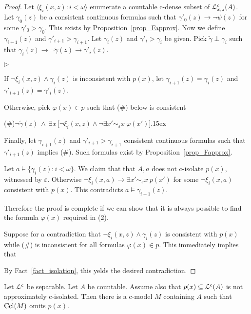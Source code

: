 \documentclass{amsproc}
\newcommand{\mylabel}[1]{{#1}\hfill}
\renewenvironment{itemize}
  {\begin{list}{$\triangleright$}{%
  \setlength{\parskip}{0mm}
  \setlength{\topsep}{.4\baselineskip}
  \setlength{\rightmargin}{0mm}
  \setlength{\listparindent}{0mm}
  \setlength{\itemindent}{0mm}
  \setlength{\labelwidth}{3ex}
  \setlength{\itemsep}{.2\baselineskip}
  \setlength{\parsep}{.2\baselineskip}
  \setlength{\partopsep}{0mm}
  \setlength{\labelsep}{1ex}
  \setlength{\leftmargin}{\labelwidth+\labelsep}
  \let\makelabel\mylabel}}{%
\end{list}}
\begin{document}
{\begin{proof}
  Let $\langle\xi_i(x,z):i<\omega\rangle$ enumerate a countable c-dense subset of ${\EuScript L}^{\rm c}_{x,z}(A)$.
  Let $\gamma_0(z)$ be a consistent continuous formulas such that $\gamma'_0(z)\rightarrow\neg\psi(z)$ for some $\gamma'_0>\gamma_0$.
  This exists by Proposition~\ref{prop_Fapprox}.
  Now we define $\gamma_{i+1}(z)$ and $\gamma'_{i+1}>\gamma_{i+1}$.
  Let $\gamma_i(z)$ and $\gamma'_i>\gamma_i$ be given.
  Pick $\tilde{\gamma}\perp\gamma_i$ such that $\gamma_i(z)\rightarrow\neg\tilde{\gamma}(z)\rightarrow\gamma'_i(z)$.
  
  \begin{itemize}
  \item[1.] If $\neg\xi_i(x,z)\wedge\gamma_i(z)$ is inconsistent with $p(x)$, let $\gamma_{i+1}(z)=\gamma_i(z)$ and  $\gamma'_{i+1}(z)=\gamma'_i(z)$.
  \item[2.] Otherwise, pick $\varphi(x)\in p$ such that (\#) below is consistent
  
  (\#)\hfil $\neg\tilde{\gamma}(z)\ \wedge\ \exists x\,\big[\neg\xi_i(x,z)\wedge\neg\exists x'\sim_\varepsilon x\ \varphi(x')\big].$\kern15ex
  
  Finally, let $\gamma_{i+1}(z)$ and $\gamma'_{i+1}>\gamma_{i+1}$ consistent continuous formulas such that $\gamma'_{i+1}(z)$ implies (\#).
  Such formulas exist by Proposition~\ref{prop_Fapprox}.
  \end{itemize}
  
  Let $a\models\{\gamma_i(z):i<\omega\}$.
  We claim that that $A,a$ does not c-isolate $p(x)$, witnessed by $\varepsilon$.
  Otherwise $\neg\xi_i(x,a)\rightarrow\exists x'\sim_\varepsilon x\  p(x')$ for some $\neg\xi_i(x,a)$ consistent with $p(x)$.
  This contradicts $a\models\gamma_{i+1}(z)$.
  
  Therefore the proof is complete if we can show that it is always possible to find the formula $\varphi(x)$ required in (2).
  
  Suppose for a contradiction that $\neg\xi_i(x,z)\wedge\gamma_i(z)$ is consistent with $p(x)$ while (\#) is inconsistent for all formulas $\varphi(x)\in p$.
  This immediately implies that 
  
  
  By Fact~\ref{fact_isolation}, this yelds the desired contradiction.
\end{proof}

\begin{theorem}\label{thm_cOTT}
  Let ${\EuScript L}^{\rm c}$ be separable.
  Let $A$ be countable.
  Assume also that $p(x)\subseteq{\EuScript L}^{\rm c}(A)$ is not approximately c-isolated.
  Then there is a c-model $M$ containing $A$ such that ${\rm Ccl}(M)$ omits $p(x)$. 
\end{theorem}

}
\end{document}
